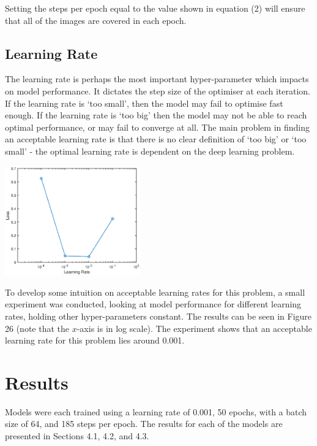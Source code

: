 \documentclass[a4paper]{article}
\begin{document}
Setting the steps per epoch equal to the value shown in equation (2) will ensure that all of the images are covered in each epoch.

\subsection{Learning Rate}
\begin{minipage}{0.45\textwidth}
The learning rate is perhaps the most important hyper-parameter which impacts on model performance. It dictates the step size of the optimiser at each iteration. If the learning rate is `too small', then the model may fail to optimise fast enough. If the learning rate is `too big' then the model may not be able to reach optimal performance, or may fail to converge at all. The main problem in finding an acceptable learning rate is that there is no clear definition of `too big' or `too small' - the optimal learning rate is dependent on the deep learning problem.
\end{minipage}
\hspace{1cm}
\begin{minipage}{0.45\textwidth}
\centering
\includegraphics[height=4.7cm]{hyp_par_3}
\end{minipage}

\vspace{0.2cm}

To develop some intuition on acceptable learning rates for this problem, a small experiment was conducted, looking at model performance for different learning rates, holding other hyper-parameters constant. The results can be seen in Figure 26 (note that the $x$-axis is in log scale). The experiment shows that an acceptable learning rate for this problem lies around 0.001.

\section{Results}
Models were each trained using a learning rate of 0.001, 50 epochs, with a batch size of 64, and 185 steps per epoch. The results for each of the models are presented in Sections 4.1, 4.2, and 4.3.
\end{document}
